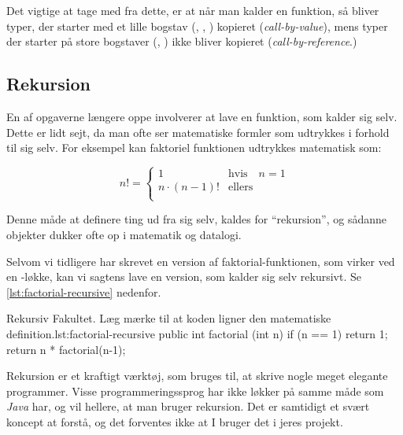         Det vigtige at tage med fra dette, er at når man kalder en
        funktion, så bliver typer, der starter med et lille bogstav
        (, , ) kopieret
        (\emph{call-by-value}), mens typer der starter på store
        bogstaver (, ) ikke bliver kopieret
        (\emph{call-by-reference}.)

	\subsection{Rekursion}

        En af opgaverne længere  oppe
        involverer at lave en funktion, som kalder sig selv. Dette er
        lidt sejt, da man ofte ser matematiske formler som udtrykkes i
        forhold til sig selv. For eksempel kan faktoriel funktionen
        udtrykkes matematisk som:

        \begin{equation}
            n! = \begin{cases}
                       1 & \text{hvis} \quad n = 1 \\
                       n\cdot(n-1)! & \text{ellers} \\
                  \end{cases}
        \end{equation}

        Denne måde at definere ting ud fra sig selv, kaldes for
        ``rekursion'', og sådanne objekter dukker ofte op i matematik
        og datalogi.


        Selvom vi tidligere har skrevet en version af
        faktorial-funktionen, som virker ved en -løkke,
        kan vi sagtens lave en version, som kalder sig selv rekursivt.
        Se \autoref{lst:factorial-recursive} nedenfor.

        \begin{JavaCode}{Rekursiv Fakultet. Læg mærke til at koden ligner den matematiske definition.}{lst:factorial-recursive}
            public int factorial (int n) {
                if (n == 1)   return 1;
                return n * factorial(n-1);
            }
        \end{JavaCode}

        Rekursion er et kraftigt værktøj, som bruges til, at skrive
        nogle meget elegante programmer. Visse programmeringssprog har
        ikke løkker på samme måde som \emph{Java} har, og vil hellere,
        at man bruger rekursion.  Det er samtidigt et svært koncept at
        forstå, og det forventes ikke at I bruger det i jeres projekt.

